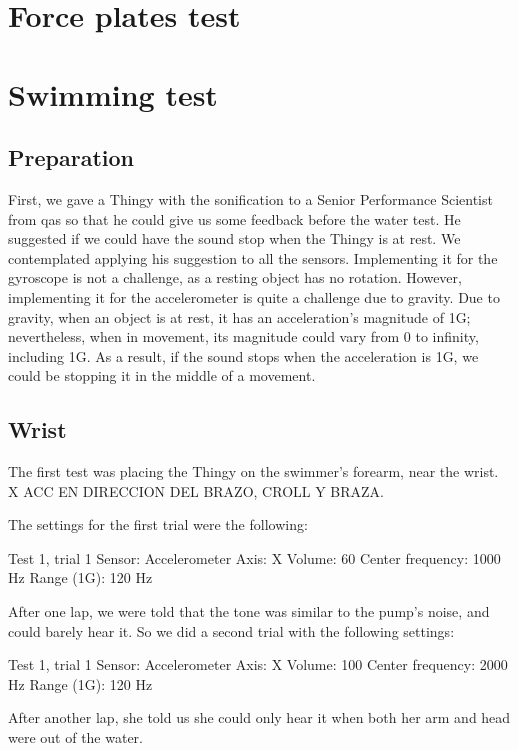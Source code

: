 \section{Force plates test}


\section{Swimming test}

\subsection{Preparation}
First, we gave a Thingy with the sonification to a Senior Performance Scientist from \gls{qas} so that he could give us some feedback before the water test. He suggested if we could have the sound stop when the Thingy is at rest. We contemplated applying his suggestion to all the sensors. Implementing it for the gyroscope is not a challenge, as a resting object has no rotation. However, implementing it for the accelerometer is quite a challenge due to gravity. Due to gravity, when an object is at rest, it has an acceleration's magnitude of 1G; nevertheless, when in movement, its magnitude could vary from 0 to infinity, including 1G. As a result, if the sound stops when the acceleration is 1G, we could be stopping it in the middle of a movement.

\subsection{Wrist}
The first test was placing the Thingy on the swimmer's forearm, near the wrist. X ACC EN DIRECCION DEL BRAZO, CROLL Y BRAZA.

The settings for the first trial were the following:
\begin{settings}{Test 1, trial 1}
Sensor: 					Accelerometer
Axis: 					X
Volume:					60%
Center frequency: 	1000 Hz
Range (1G):				120 Hz
\end{settings}
After one lap, we were told that the tone was similar to the pump's noise, and could barely hear it. So we did a second trial with the following settings:
\begin{settings}{Test 1, trial 1}
Sensor: 					Accelerometer
Axis: 					X
Volume:					100%
Center frequency: 	2000 Hz
Range (1G):				120 Hz
\end{settings}

After another lap, she told us she could only hear it when both her arm and head were out of the water.

